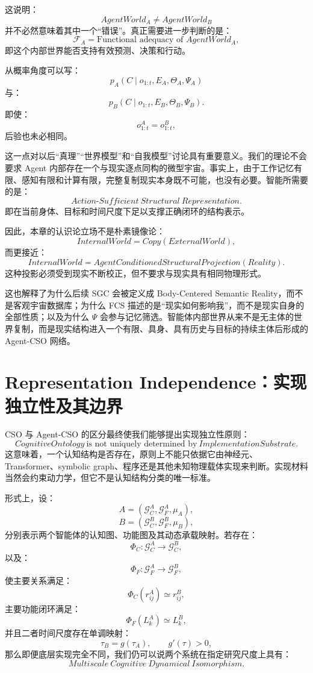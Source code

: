 这说明：
\[
AgentWorld_A
\neq
AgentWorld_B
\]
并不必然意味着其中一个“错误”。真正需要进一步判断的是：
\[
\mathcal F_A
=
\text{Functional adequacy of }AgentWorld_A,
\]
即这个内部世界能否支持有效预测、决策和行动。

从概率角度可以写：
\[
p_A(C\mid o_{1:t},E_A,\Theta_A,\Psi_A)
\]
与：
\[
p_B(C\mid o_{1:t},E_B,\Theta_B,\Psi_B).
\]
即使：
\[
o_{1:t}^{A}=o_{1:t}^{B},
\]
后验也未必相同。

这一点对以后“真理”“世界模型”和“自我模型”讨论具有重要意义。我们的理论不会要求 Agent 内部存在一个与现实逐点同构的微型宇宙。事实上，由于工作记忆有限、感知有限和计算有限，完整复制现实本身既不可能，也没有必要。智能所需要的是：
\[
\boxed{
Action\text{-}Sufficient\ Structural\ Representation.
}
\]
即在当前身体、目标和时间尺度下足以支撑正确闭环的结构表示。

因此，本章的认识论立场不是朴素镜像论：
\[
InternalWorld
=
Copy(ExternalWorld),
\]
而更接近：
\[
\boxed{
InternalWorld
=
AgentConditionedStructuralProjection(Reality).
}
\]
这种投影必须受到现实不断校正，但不要求与现实具有相同物理形式。

这也解释了为什么后续 SGC 会被定义成 Body-Centered Semantic Reality，而不是客观宇宙数据库；为什么 FCS 描述的是“现实如何影响我”，而不是现实自身的全部性质；以及为什么 $\Psi$ 会参与记忆筛选。智能体内部世界从来不是无主体的世界复制，而是现实结构进入一个有限、具身、具有历史与目标的持续主体后形成的 Agent-CSO 网络。

\section{Representation Independence：实现独立性及其边界}

CSO 与 Agent-CSO 的区分最终使我们能够提出实现独立性原则：
\[
\boxed{
CognitiveOntology
\ \text{is not uniquely determined by}\
ImplementationSubstrate.
}
\]
这意味着，一个认知结构是否存在，原则上不能只依据它由神经元、Transformer、symbolic graph、程序还是其他未知物理载体实现来判断。实现材料当然会约束动力学，但它不是认知结构分类的唯一标准。

形式上，设：
\[
A=(\mathcal G_C^A,\mathcal G_F^A,\mu_A),
\]
\[
B=(\mathcal G_C^B,\mathcal G_F^B,\mu_B),
\]
分别表示两个智能体的认知图、功能图及其动态承载映射。若存在：
\[
\Phi_C:
\mathcal G_C^A
\rightarrow
\mathcal G_C^B,
\]
以及：
\[
\Phi_F:
\mathcal G_F^A
\rightarrow
\mathcal G_F^B,
\]
使主要关系满足：
\[
\Phi_C(r_{ij}^A)
\simeq
r_{ij}^B,
\]
主要功能闭环满足：
\[
\Phi_F(L_k^A)
\simeq
L_k^B,
\]
并且二者时间尺度存在单调映射：
\[
\tau_B
=
g(\tau_A),
\qquad
g'(\tau)>0,
\]
那么即便底层实现完全不同，我们仍可以说两个系统在指定研究尺度上具有：
\[
\boxed{
Multiscale\ Cognitive\ Dynamical\ Isomorphism.
}
\]

